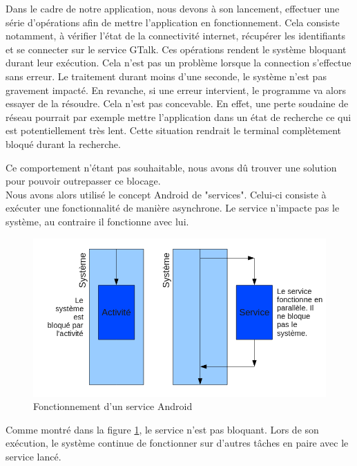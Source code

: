 Dans le cadre de notre application, nous devons à son lancement, effectuer une série d'opérations 
afin de mettre l'application en fonctionnement. Cela consiste notamment, à vérifier l'état de la 
connectivité internet, récupérer les identifiants et se connecter sur le service GTalk. Ces 
opérations rendent le système bloquant durant leur exécution. Cela n'est pas un problème lorsque la 
connection s'effectue sans erreur. Le traitement durant moins d'une seconde, le système n'est pas
gravement impacté. En revanche, si une erreur intervient, le programme va alors essayer de la résoudre.
Cela n'est pas concevable. En effet, une perte soudaine de réseau pourrait par exemple mettre 
l'application dans un état de recherche ce qui est potentiellement très lent. Cette situation rendrait
le terminal complètement bloqué durant la recherche. 

Ce comportement n'étant pas souhaitable, nous avons dû trouver une solution pour pouvoir outrepasser ce blocage.
\\


Nous avons alors utilisé le concept Android de "services". Celui-ci consiste à exécuter une fonctionnalité 
de manière asynchrone. Le service n'impacte pas le système, au contraire il fonctionne avec lui. 
 
\begin{figure}[!h]
  \center
  \includegraphics[width=13cm]{img/fonctionnement-des-services-android.png}
  \caption{Fonctionnement d'un service Android}
  \label{fonctionnement-des-services-android}
\end{figure}

Comme montré dans la figure \ref{fonctionnement-des-services-android}, le service n'est pas  bloquant. 
Lors de son exécution, le système continue de fonctionner sur d'autres tâches en paire avec le service lancé.
\\


